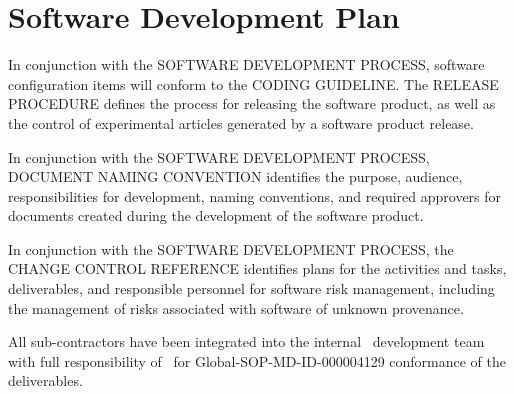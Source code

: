 \section{Software Development Plan}
In conjunction with the SOFTWARE DEVELOPMENT PROCESS, software configuration
items will conform to the CODING GUIDELINE. The RELEASE PROCEDURE defines the
process for releasing the software product, as well as the control of
experimental articles generated by a software product release.

\tlcVspace

In conjunction with the SOFTWARE DEVELOPMENT PROCESS, DOCUMENT NAMING CONVENTION
identifies the purpose, audience, responsibilities for development, naming
conventions, and required approvers for documents created during the development
of the software product.

\tlcVspace

In conjunction with the SOFTWARE DEVELOPMENT PROCESS, the CHANGE CONTROL
REFERENCE identifies plans for the activities and tasks, deliverables, and
responsible personnel for software risk management, including the management of
risks associated with software of unknown provenance.

\tlcVspace

All sub-contractors have been integrated into the internal \autodocCompanyName\
development team with full responsibility of \autodocCompanyName\ for
Global-SOP-MD-ID-000004129 conformance of the deliverables.
